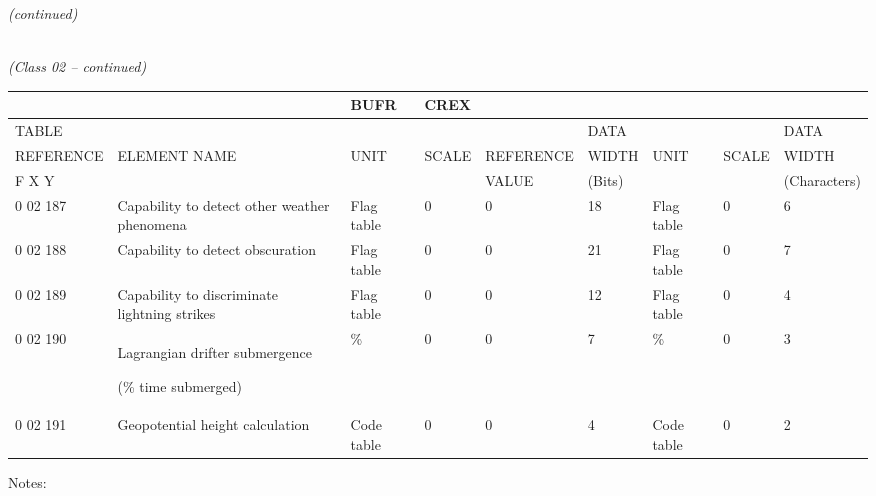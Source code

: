 \emph{(continued)}

\emph{\\
(Class 02 -- continued)}

\begin{longtable}[]{@{}lllllllll@{}}
\toprule
& & BUFR & CREX & & & & &\tabularnewline
\midrule
\endhead
TABLE & & & & & DATA & & & DATA\tabularnewline
REFERENCE & ELEMENT NAME & UNIT & SCALE & REFERENCE & WIDTH & UNIT & SCALE & WIDTH\tabularnewline
F X Y & & & & VALUE & (Bits) & & & (Characters)\tabularnewline
0 02 187 & Capability to detect other weather phenomena & Flag table & 0 & 0 & 18 & Flag table & 0 & 6\tabularnewline
0 02 188 & Capability to detect obscuration & Flag table & 0 & 0 & 21 & Flag table & 0 & 7\tabularnewline
0 02 189 & Capability to discriminate lightning strikes & Flag table & 0 & 0 & 12 & Flag table & 0 & 4\tabularnewline
\begin{minipage}[t]{0.08\columnwidth}\raggedright
0 02 190\strut
\end{minipage} & \begin{minipage}[t]{0.08\columnwidth}\raggedright
Lagrangian drifter submergence

(\% time submerged)\strut
\end{minipage} & \begin{minipage}[t]{0.08\columnwidth}\raggedright
\%\strut
\end{minipage} & \begin{minipage}[t]{0.08\columnwidth}\raggedright
0\strut
\end{minipage} & \begin{minipage}[t]{0.08\columnwidth}\raggedright
0\strut
\end{minipage} & \begin{minipage}[t]{0.08\columnwidth}\raggedright
7\strut
\end{minipage} & \begin{minipage}[t]{0.08\columnwidth}\raggedright
\%\strut
\end{minipage} & \begin{minipage}[t]{0.08\columnwidth}\raggedright
0\strut
\end{minipage} & \begin{minipage}[t]{0.08\columnwidth}\raggedright
3\strut
\end{minipage}\tabularnewline
0 02 191 & Geopotential height calculation & Code table & 0 & 0 & 4 & Code table & 0 & 2\tabularnewline
\bottomrule
\end{longtable}

Notes:

